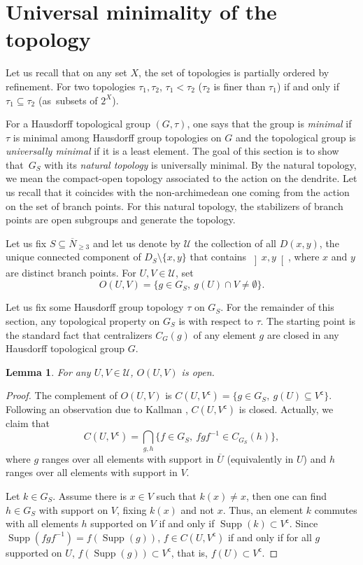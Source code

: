 \documentclass[JEP,XML,SOM,Unicode,NoFloatCountersInSection]{cedram}
\let\mathcal\mathscr
\theoremstyle{plain}
\newtheorem{lem}[thm]{Lemma}
\theoremstyle{definition}
\newcommand{\cU}{\mathcal{U}}
\newcommand{\sfc}{\mathsf{c}}
\DeclareMathOperator{\supp}{Supp}
\begin{document}
\section{Universal minimality of the topology}\label{umin}

Let us recall that on any set $X$, the set of topologies is partially ordered by refine\-ment. For two topologies $\tau_1,\tau_2$, $\tau_1<\tau_2$ ($\tau_2$ is finer than $\tau_1$) if and only if $\tau_1\subseteq\tau_2$ (as~subsets of $2^X$).

For a Hausdorff topological group $(G,\tau)$, one says that the group is \emph{minimal} if~$\tau$ is minimal among Hausdorff group topologies on $G$ and the topological group is \emph{universally minimal} if it is a least element. The goal of this section is to show that~$G_S$ with its \emph{natural topology} is universally minimal. By the natural topology, we mean the compact-open topology associated to the action on the dendrite. Let us recall that it coincides with the non-archimedean one coming from the action on the set of branch points. For this natural topology, the stabilizers of branch points are open subgroups and generate the topology.

Let us fix $S\subseteq\overline{N}_{\geq3}$ and let us denote by $\cU$ the collection of all $D(x,y)$, the unique connected component of $D_S\setminus\{x,y\}$ that contains $\left]x,y\right[$, where $x$ and $y$ are distinct branch points. For $U,V\in\cU$, set
\[
O(U,V)=\{g\in G_S,\ g(U)\cap V\neq\emptyset\}.
\]

Let us fix some Hausdorff group topology $\tau$ on $G_S$. For the remainder of this section, any topological property on $G_S$ is with respect to $\tau$. The starting point is the standard fact that centralizers $C_G(g)$ of any element $g$ are closed in any Hausdorff topological group $G$.

\begin{lem} For any $U,V\in\cU$, $O(U,V)$ is open.
\end{lem}

\begin{proof} The complement of $O(U,V)$ is $C(U,V^\sfc)=\{g\in G_S,\ g(U)\subseteq V^\sfc\}$. Following an observation due to Kallman \cite[Th.\,1.1]{MR831205}, $C(U,V^\sfc)$ is closed. Actually, we claim that
\[
C(U,V^\sfc)=\bigcap_{g,h}\{f\in G_S,\ fgf^{-1}\in C_{G_S}(h)\},
\]
where $g$ ranges over all elements with support in $\overline{U}$ (equivalently in $U$) and $h$ ranges over all elements with support in $V$.

Let $k\in G_S$. Assume there is $x\in V$ such that $k(x)\neq x$, then one can find $h\in G_S$ with support on $V$, fixing $k(x)$ and not $x$. Thus, an element $k$ commutes with all elements $h$ supported on $V$ if and only if $\supp(k)\subset V^\sfc$. Since $\supp(fgf^{-1})=f(\supp(g))$, $f\in C(U,V^\sfc)$ if and only if for all $g$ supported on $U$, $f(\supp(g))\subset V^\sfc$, that is, $f(U)\subset V^\sfc$.
\end{proof}
\end{document}
